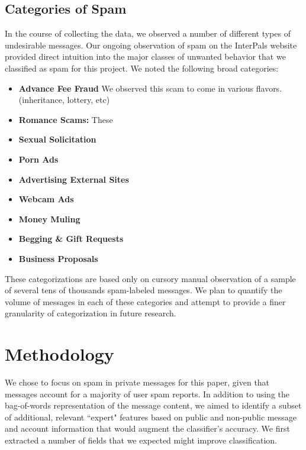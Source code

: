 \documentclass[preprint]{acm_proc_article-sp}
\begin{document}
\subsection{Categories of Spam}

In the course of collecting the data, we observed a number of different types of 
undesirable messages. Our ongoing observation of spam on the InterPals website provided 
direct intuition into the major classes of unwanted behavior that we classified as spam for 
this project. We noted the following broad categories:

\begin{itemize}
\item \textbf{Advance Fee Fraud} We observed this scam to come in various flavors.  (inheritance, lottery,  etc)
\item \textbf{Romance Scams:} These 
\item \textbf{Sexual Solicitation}
\item \textbf{Porn Ads}
\item \textbf{Advertising External Sites}
\item \textbf{Webcam Ads}
\item \textbf{Money Muling}
\item \textbf{Begging \& Gift Requests}
\item \textbf{Business Proposals}
\end{itemize}

These categorizations are based only on cursory manual observation of a sample of several tens of thousands 
spam-labeled messages. We plan to quantify the volume of messages in each of these categories and 
attempt to provide a finer granularity of categorization in future research. 





\section{Methodology}

We chose to focus on spam in private messages for this paper, given that messages account for 
a majority of user spam reports. In addition to using the bag-of-words representation of 
the message content, we aimed to identify a subset of additional, relevant ``expert" features 
based on public and non-public message and account information that would augment the classifier's 
accuracy. We first extracted a number of fields that we expected might improve classification. 
\end{document}
